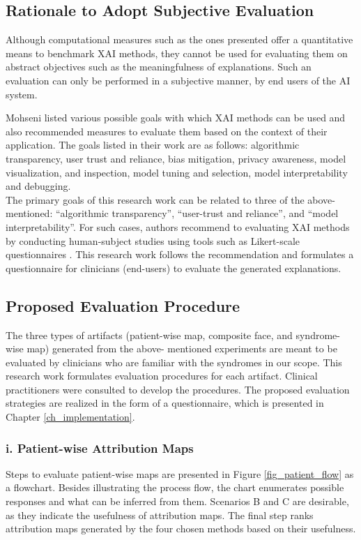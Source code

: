 \documentclass[../report.tex]{subfiles}
\begin{document}
    \subsection{Rationale to Adopt Subjective Evaluation}
    \noindent
    Although computational measures such as the ones presented offer a quantitative means to benchmark XAI methods, they cannot be used for evaluating them on abstract objectives such as the meaningfulness of explanations. Such an evaluation can only be performed in a subjective manner, by end users of the AI system.
    
    Mohseni \etal \cite{mohseni2021multidisciplinary} listed various possible goals with which XAI methods can be used and also recommended measures to evaluate them based on the context of their application. The goals listed in their work are as follows: algorithmic transparency, user trust and reliance, bias mitigation, privacy awareness, model visualization, and inspection, model tuning and selection, model interpretability and debugging.\\ 
    The primary goals of this research work can be related to three of the above-mentioned: \enquote{algorithmic transparency}, \enquote{user-trust and reliance}, and \enquote{model interpretability}. For such cases, authors recommend to evaluating XAI methods by conducting human-subject studies using tools such as Likert-scale questionnaires \cite{likert_scale}. This research work follows the recommendation and formulates a questionnaire for clinicians (end-users) to evaluate the generated explanations. 
    \subsection{Proposed Evaluation Procedure}
    \noindent
    The three types of artifacts (patient-wise map, composite face, and syndrome-wise map) generated from the above- mentioned experiments are meant to be evaluated by clinicians who are familiar with the syndromes in our scope. This research work formulates evaluation procedures for each artifact. Clinical practitioners were consulted to develop the procedures. The proposed evaluation strategies are realized in the form of a questionnaire, which is presented in Chapter \ref{ch_implementation}.
    \subsubsection{i. Patient-wise Attribution Maps}
    Steps to evaluate patient-wise maps are presented in Figure \ref{fig_patient_flow} as a flowchart. Besides illustrating the process flow, the chart enumerates possible responses and what can be inferred from them. Scenarios B and C are desirable, as they indicate the usefulness of attribution maps. The final step ranks attribution maps generated by the four chosen methods based on their usefulness.
    
\end{document}
